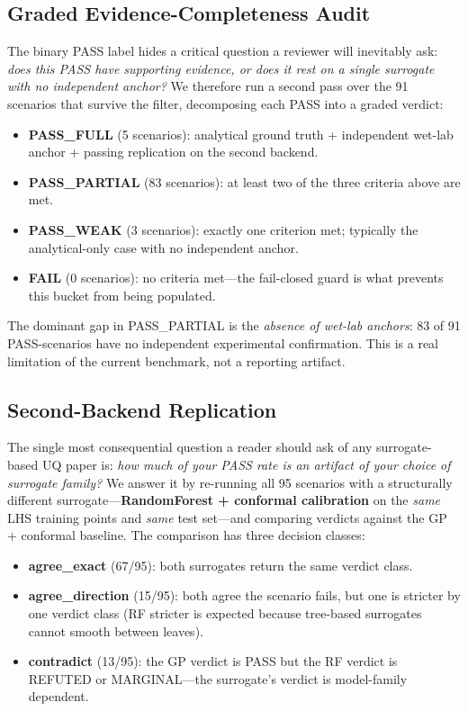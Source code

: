 \documentclass[journal]{IEEEtran}
\begin{document}
\subsection{Graded Evidence-Completeness Audit}

The binary PASS label hides a critical question a reviewer will inevitably
ask: \textit{does this PASS have supporting evidence, or does it rest on a
single surrogate with no independent anchor?} We therefore run a second pass
over the 91 scenarios that survive the filter, decomposing each PASS into a
graded verdict:

\begin{itemize}
    \item \textbf{PASS\_FULL} (5 scenarios): analytical ground truth +
    independent wet-lab anchor + passing replication on the second backend.
    \item \textbf{PASS\_PARTIAL} (83 scenarios): at least two of the three
    criteria above are met.
    \item \textbf{PASS\_WEAK} (3 scenarios): exactly one criterion met;
    typically the analytical-only case with no independent anchor.
    \item \textbf{FAIL} (0 scenarios): no criteria met---the fail-closed guard
    is what prevents this bucket from being populated.
\end{itemize}

The dominant gap in PASS\_PARTIAL is the \textit{absence of wet-lab anchors}:
83 of 91 PASS-scenarios have no independent experimental confirmation. This is
a real limitation of the current benchmark, not a reporting artifact.

\subsection{Second-Backend Replication}

The single most consequential question a reader should ask of any
surrogate-based UQ paper is: \textit{how much of your PASS rate is an artifact
of your choice of surrogate family?} We answer it by re-running all 95
scenarios with a structurally different surrogate---\textbf{RandomForest +
conformal calibration} on the \textit{same} LHS training points and
\textit{same} test set---and comparing verdicts against the GP + conformal
baseline. The comparison has three decision classes:

\begin{itemize}
    \item \textbf{agree\_exact} (67/95): both surrogates return the same
    verdict class.
    \item \textbf{agree\_direction} (15/95): both agree the scenario fails,
    but one is stricter by one verdict class (RF stricter is expected because
    tree-based surrogates cannot smooth between leaves).
    \item \textbf{contradict} (13/95): the GP verdict is PASS but the RF
    verdict is REFUTED or MARGINAL---the surrogate's verdict is model-family
    dependent.
\end{itemize}
\end{document}
